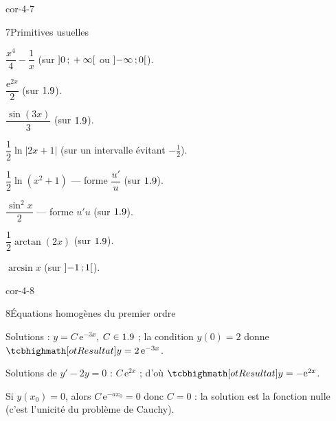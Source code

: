 \begin{blocLivre}{cor-4-7}
\begin{corrige}{7}{Primitives usuelles}
\begin{questions}
  \item $\dfrac{x^{4}}{4}-\dfrac1x$ (sur $\mathopen{]}0\,{;}\,+\infty\mathclose{[}$ ou $\mathopen{]}-\infty\,{;}\,0\mathclose{[}$).
  \item $\dfrac{\mathrm{e}^{2x}}{2}$ (sur $1.9$).
  \item $\dfrac{\sin(3x)}{3}$ (sur $1.9$).
  \item $\dfrac12\ln|2x+1|$ (sur un intervalle évitant $-\frac12$).
  \item $\dfrac12\ln(x^{2}+1)$ — forme $\dfrac{u'}{u}$ (sur $1.9$).
  \item $\dfrac{\sin^{2}x}{2}$ — forme $u'u$ (sur $1.9$).
  \item $\dfrac12\arctan(2x)$ (sur $1.9$).
  \item $\arcsin x$ (sur $\mathopen{]}-1\,{;}\,1\mathclose{[}$).
\end{questions}
\end{corrige}
\end{blocLivre}

\begin{blocLivre}{cor-4-8}
\begin{corrige}{8}{Équations homogènes du premier ordre}
\begin{questions}
  \item Solutions : $y=C\,\mathrm{e}^{-3x}$, $C\in1.9$ ; la condition $y(0)=2$
    donne $\res{y=2\,\mathrm{e}^{-3x}}$.
  \item Solutions de $y'-2y=0$ : $C\,\mathrm{e}^{2x}$ ; d'où $\res{y=-\mathrm{e}^{2x}}$.
  \item Si $y(x_0)=0$, alors $C\,\mathrm{e}^{-ax_0}=0$ donc $C=0$ : la solution
    est la fonction nulle (c'est l'unicité du problème de Cauchy).
\end{questions}
\end{corrige}
\end{blocLivre}

